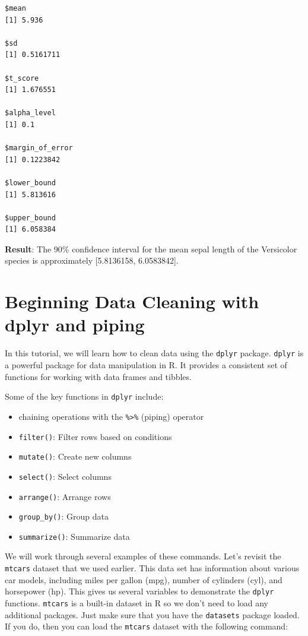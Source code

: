 \documentclass[
  letterpaper,
  DIV=11,
  numbers=noendperiod]{scrreprt}
\providecommand{\tightlist}{%
  \setlength{\itemsep}{0pt}\setlength{\parskip}{0pt}}\usepackage{longtable,booktabs,array}
\begin{document}
\begin{verbatim}
$mean
[1] 5.936

$sd
[1] 0.5161711

$t_score
[1] 1.676551

$alpha_level
[1] 0.1

$margin_of_error
[1] 0.1223842

$lower_bound
[1] 5.813616

$upper_bound
[1] 6.058384
\end{verbatim}

\textbf{Result}: The 90\% confidence interval for the mean sepal length
of the Versicolor species is approximately {[}5.8136158, 6.0583842{]}.


\chapter*{Beginning Data Cleaning with dplyr and
piping}\label{beginning-data-cleaning-with-dplyr-and-piping}


In this tutorial, we will learn how to clean data using the
\texttt{dplyr} package. \texttt{dplyr} is a powerful package for data
manipulation in R. It provides a consistent set of functions for working
with data frames and tibbles.

Some of the key functions in \texttt{dplyr} include:

\begin{itemize}
\tightlist
\item
  chaining operations with the \texttt{\%\textgreater{}\%} (piping)
  operator
\item
  \texttt{filter()}: Filter rows based on conditions
\item
  \texttt{mutate()}: Create new columns
\item
  \texttt{select()}: Select columns
\item
  \texttt{arrange()}: Arrange rows
\item
  \texttt{group\_by()}: Group data
\item
  \texttt{summarize()}: Summarize data
\end{itemize}

We will work through several examples of these commands. Let's revisit
the \texttt{mtcars} dataset that we used earlier. This data set has
information about various car models, including miles per gallon (mpg),
number of cylinders (cyl), and horsepower (hp). This gives us several
variables to demonstrate the \texttt{dplyr} functions. \texttt{mtcars}
is a built-in dataset in R so we don't need to load any additional
packages. Just make sure that you have the \texttt{datasets} package
loaded. If you do, then you can load the \texttt{mtcars} dataset with
the following command:
\end{document}
